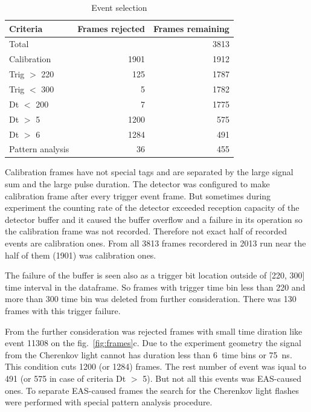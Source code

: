 \documentclass[final,5p,times,twocolumn]{elsarticle}
\begin{document}
\begin{table}[bth]
    \centering
    \caption{Event selection}
    \label{tab:rejection}
    \vspace{1pc}
    \begin{tabular}{|l||r|r|}
    \hline
    Criteria & Frames rejected & Frames remaining\\ 
    \hline \hline
    Total         &      & 3813\\
    \hline
    Calibration   & 1901 & 1912\\
    Trig $>$ 220  &  125 & 1787\\
    Trig $<$ 300  &    5 & 1782\\
    Dt   $<$ 200  &    7 & 1775\\
    Dt   $>$  5   & 1200 &  575\\
    Dt   $>$  6   & 1284 &  491\\
    Pattern analysis& 36 &  455\\
    \hline
    \end{tabular}
\end{table}

Calibration frames have not special tags and are separated by the large signal sum and the large pulse duration. The detector was configured to make calibration frame after every trigger event frame. But sometimes during experiment the counting rate of the detector exceeded reception capacity of the detector buffer and it caused the buffer overflow and a failure in its operation so the calibration frame was not recorded. Therefore not exact half of recorded events are calibration ones.
From all 3813 frames recordered in 2013 run near the half of them (1901) was calibration ones. 

The failure of the buffer is seen also as a trigger bit location outside of [220, 300] time interval in the dataframe. So frames with trigger time bin less than 220 and more than 300 time bin was deleted from further consideration. There was 130 frames with this trigger failure.

From the further consideration was rejected frames with small time diration like event 11308 on the fig.~\ref{fig:frames}c. Due to the experiment geometry the signal from the Cherenkov light cannot has duration less than 6~time bins or 75~ns. This condition cuts 1200 (or 1284) frames. 
The rest number of event was iqual to 491 (or 575 in case of criteria Dt $>$ 5). But not all this events was EAS-caused ones. To separate EAS-caused frames the search for the Cherenkov light flashes were performed with special pattern analysis procedure. %
\end{document}
